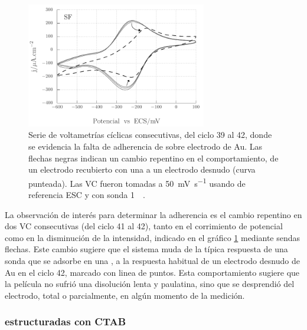 				\begin{figure}[bh!]
				 	   	    \begin{center} 
				        	\includegraphics[width=0.70\textwidth]{Graficos/Adherencia_F127.pdf}
				       		\caption[Adherencia de \pdmF \space sobre una película delgada de Au.]{Serie de voltametrías cíclicas consecutivas, del ciclo 39 al 42, donde se evidencia la falta de adherencia de \pdmF\space sobre electrodo de Au. Las flechas negras indican un cambio repentino en el comportamiento, de un electrodo recubierto con una \pdm\space a un electrodo desnudo (curva punteada). Las VC fueron tomadas a \SI{50}{\milli\volt.\second^{-1}} usando de referencia ESC y con sonda \ru\space \SI{1}{\milli\Molar}.}
				         	\label{fig:adherencia_F127}
				     		\end{center}
				     		\end{figure}

			La observación de interés para determinar la adherencia es el cambio repentino en dos VC consecutivas (del ciclo 41 al 42), tanto en el corrimiento de potencial como en la disminución de la intensidad, indicado en el gráfico \ref{fig:adherencia_F127} mediante sendas flechas. Este cambio sugiere que el sistema muda de la típica respuesta de una sonda que se adsorbe en una \pdm, a la respuesta habitual de un electrodo desnudo de Au en el ciclo 42, marcado con linea de puntos. Esta comportamiento sugiere que la película no sufrió una disolución lenta y paulatina, sino que se desprendió del electrodo, total o parcialmente, en algún momento de la medición.	     		

			\subsubsection*{\pdm\space estructuradas con CTAB}	     		
				     		
